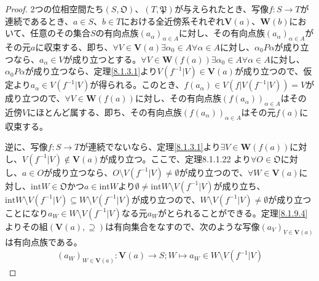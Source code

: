 \documentclass[dvipdfmx]{jsarticle}
\begin{document}
\begin{proof}
2つの位相空間たち$\left( S,\mathfrak{O} \right)$、$\left( T,\mathfrak{P} \right)$が与えられたとき、写像$f:S \rightarrow T$が連続であるとき、$a \in S$、$b \in T$における全近傍系それぞれ$\mathbf{V}(a)$、$\mathbf{W}(b)$において、任意のその集合$S$の有向点族$\left( a_{\alpha} \right)_{\alpha \in A}$に対し、その有向点族$\left( a_{\alpha} \right)_{\alpha \in A}$がその元$a$に収束する、即ち、$\forall V \in \mathbf{V}(a)\exists\alpha_{0} \in A\forall\alpha \in A$に対し、$\alpha_{0}P\alpha$が成り立つなら、$a_{\alpha} \in V$が成り立つとする。$\forall V \in \mathbf{W}\left( f(a) \right)\exists\alpha_{0} \in A\forall\alpha \in A$に対し、$\alpha_{0}P\alpha$が成り立つなら、定理\ref{8.1.3.1}より$V\left( f^{- 1}|V \right) \in \mathbf{V}(a)$が成り立つので、仮定より$a_{\alpha} \in V\left( f^{- 1}|V \right)$が得られる。このとき、$f\left( a_{\alpha} \right) \in V\left( f|V\left( f^{- 1}|V \right) \right) = V$が成り立つので、$\forall V \in \mathbf{W}\left( f(a) \right)$に対し、その有向点族$\left( f\left( a_{\alpha} \right) \right)_{\alpha \in A}$はその近傍$V$にほとんど属する、即ち、その有向点族$\left( f\left( a_{\alpha} \right) \right)_{\alpha \in A}$はその元$f(a)$に収束する。\par
逆に、写像$f:S \rightarrow T$が連続でないなら、定理\ref{8.1.3.1}より$\exists V \in \mathbf{W}\left( f(a) \right)$に対し、$V\left( f^{- 1}|V \right) \notin \mathbf{V}(a)$が成り立つ。ここで、定理8.1.1.22
より$\forall O \in \mathfrak{O}$に対し、$a \in O$が成り立つなら、$O \setminus V\left( f^{- 1}|V \right) \neq \emptyset$が成り立つので、$\forall W \in \mathbf{V}(a)$に対し、${\mathrm{int}}W\in \mathfrak{O}$かつ$a \in {\mathrm{int}}W$より$\emptyset \neq {\mathrm{int}}W \setminus V\left( f^{- 1}|V \right)$が成り立ち、${\mathrm{int}}W \setminus V\left( f^{- 1}|V \right) \subseteq W \setminus V\left( f^{- 1}|V \right)$が成り立つので、$W \setminus V\left( f^{- 1}|V \right) \neq \emptyset$が成り立つことになり$a_{W} \in W \setminus V\left( f^{- 1}|V \right)$なる元$a_{W}$がとられることができる。定理\ref{8.1.9.4}よりその組$\left( \mathbf{V}(a), \supseteq \right)$は有向集合をなすので、次のような写像$\left( a_{V} \right)_{V \in \mathbf{V}(a)}$は有向点族である。
\begin{align*}
\left( a_{W} \right)_{W \in \mathbf{V}(a)}:\mathbf{V}(a) \rightarrow S;W \mapsto a_{W} \in W \setminus V\left( f^{- 1}|V \right)
\end{align*}

\end{proof}
\end{document}

